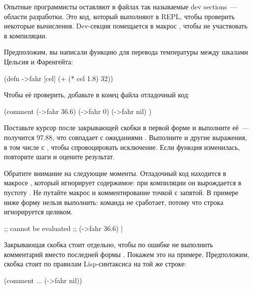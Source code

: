 Опытные программисты оставляют в файлах так называемые dev sections~--- области разработки. Это код, который выполняют в REPL, чтобы проверить некоторые вычисления. Dev-секция помещается в макрос , чтобы не участвовать в компиляции.

Предположим, вы написали функцию  для перевода температуры между шкалами Цельсия и Фаренгейта:

\begin{english}
  \begin{clojure}
(defn ->fahr [cel]
  (+ (* cel 1.8) 32))
  \end{clojure}
\end{english}

Чтобы её проверить, добавьте в конец файла отладочный код:

\begin{english}
  \begin{clojure/lines}
(comment
  (->fahr 36.6)
  (->fahr 0)
  (->fahr nil)
  )
  \end{clojure/lines}
\end{english}

Поставьте курсор после закрывающей скобки в первой форме и выполните её~--- получится 97.88, что совпадает с ожиданиями . Выполните и другие выражения, в том числе с , чтобы спровоцировать исключение. Если функция изменилась, повторите шаги и оцените результат.

Обратите внимание на следующие моменты. Отладочный код находится в макросе , который игнорирует содержимое: при компиляции он вырождается в пустоту . Не путайте макрос  и комментирование точкой с запятой. В примере ниже форму нельзя выполнить: команда  не сработает, потому что строка игнорируется целиком.

\begin{english}
  \begin{clojure}
;; cannot be evaluated
;; (->fahr 36.6) |
  \end{clojure}
\end{english}


Закрывающая скобка  стоит отдельно, чтобы по ошибке не выполнить комментарий вместо последней формы . Покажем это на примере. Предположим, скобка стоит по правилам Lisp-синтаксиса на той же строке:

\begin{english}
  \begin{clojure}
(comment
  ...
  (->fahr nil))
  \end{clojure}
\end{english}

